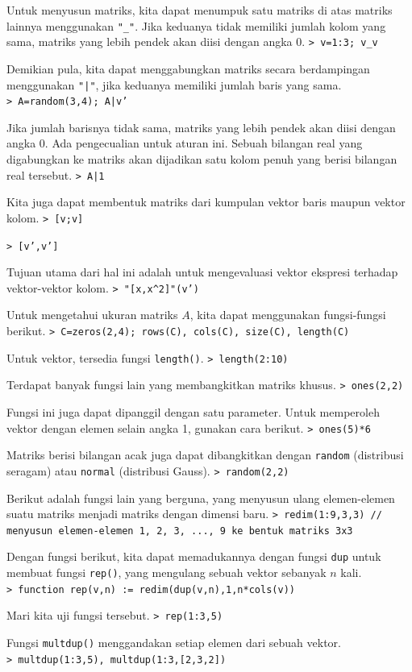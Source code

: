 \documentclass[11pt, a4paper]{article}
\newcommand{\emtcmd}[1]{\noindent\texttt{\textcolor{emtcommand}{>}\ #1}\par\smallskip}
\begin{document}
Untuk menyusun matriks, kita dapat menumpuk satu matriks di atas matriks lainnya menggunakan \texttt{"\_"}. Jika keduanya tidak memiliki jumlah kolom yang sama, matriks yang lebih pendek akan diisi dengan angka 0.
\emtcmd{v=1:3; v\_v}

Demikian pula, kita dapat menggabungkan matriks secara berdampingan menggunakan \texttt{"|"}, jika keduanya memiliki jumlah baris yang sama.
\emtcmd{A=random(3,4); A|v'}

Jika jumlah barisnya tidak sama, matriks yang lebih pendek akan diisi dengan angka 0. Ada pengecualian untuk aturan ini. Sebuah bilangan real yang digabungkan ke matriks akan dijadikan satu kolom penuh yang berisi bilangan real tersebut.
\emtcmd{A|1}

Kita juga dapat membentuk matriks dari kumpulan vektor baris maupun vektor kolom.
\emtcmd{[v;v]}
\emtcmd{[v',v']}

Tujuan utama dari hal ini adalah untuk mengevaluasi vektor ekspresi terhadap vektor-vektor kolom.
\emtcmd{"[x,x\^{}2]"(v')}

Untuk mengetahui ukuran matriks $A$, kita dapat menggunakan fungsi-fungsi berikut.
\emtcmd{C=zeros(2,4); rows(C), cols(C), size(C), length(C)}

Untuk vektor, tersedia fungsi \texttt{length()}.
\emtcmd{length(2:10)}

Terdapat banyak fungsi lain yang membangkitkan matriks khusus.
\emtcmd{ones(2,2)}

Fungsi ini juga dapat dipanggil dengan satu parameter. Untuk memperoleh vektor dengan elemen selain angka 1, gunakan cara berikut.
\emtcmd{ones(5)*6}

Matriks berisi bilangan acak juga dapat dibangkitkan dengan \texttt{random} (distribusi seragam) atau \texttt{normal} (distribusi Gauss).
\emtcmd{random(2,2)}

Berikut adalah fungsi lain yang berguna, yang menyusun ulang elemen-elemen suatu matriks menjadi matriks dengan dimensi baru.
\emtcmd{redim(1:9,3,3) \textcolor{emtcomment}{// menyusun elemen-elemen 1, 2, 3, ..., 9 ke bentuk matriks 3x3}}

Dengan fungsi berikut, kita dapat memadukannya dengan fungsi \texttt{dup} untuk membuat fungsi \texttt{rep()}, yang mengulang sebuah vektor sebanyak $n$ kali.
\emtcmd{function rep(v,n) := redim(dup(v,n),1,n*cols(v))}

Mari kita uji fungsi tersebut.
\emtcmd{rep(1:3,5)}

Fungsi \texttt{multdup()} menggandakan setiap elemen dari sebuah vektor.
\emtcmd{multdup(1:3,5), multdup(1:3,[2,3,2])}
\end{document}
